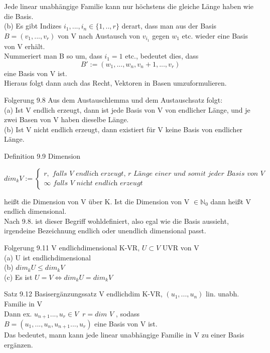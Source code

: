 \documentclass[headsepline,12pt,a4paper]{scrartcl}
\begin{document}
Jede linear unabhängige Familie kann nur höchstens die gleiche Länge haben wie die Basis. \\

(b) Es gibt Indizes $i_1,...,i_n \in \{1,..,r\}$ derart, dass man aus der Basis $B = (v_1,...,v_r)$ von V nach Austausch von $v_{i_1}$ gegen $w_1$ etc. wieder eine Basis von V erhält. \\
Nummeriert man B so um, dass $i_1 = 1$ etc., bedeutet dies, dass 
$$ B':=(w_1,...,w_n,v_n+1,...,v_r) $$ 
eine Basis von V ist. \\

Hieraus folgt dann auch das Recht, Vektoren in Basen umzuformulieren. \\

\item[Folgerung 9.8]
Aus dem Austauschlemma und dem Austauschsatz folgt: \\

(a) Ist V endlich erzeugt, dann ist jede Basis von V von endlicher Länge, und je zwei Basen von V haben dieselbe Länge. \\
(b) Ist V nicht endlich erzeugt, dann existiert für V keine Basis von endlicher Länge. \\

\newpage

\begin{center}
\item[Definition 9.9 Dimension]
\end{center}

$$\textit{dim}_k V:= \begin{cases} 
r, \textit{      falls V endlich erzeugt, r Länge einer und somit jeder Basis von V} \\
\infty \textit{     falls V nicht endlich erzeugt } 
\end{cases} $$

heißt die Dimension von V über K. Ist die Dimension von V $\in \mathbb{N}_0$ dann heißt V endlich dimensional. \\
Nach 9.8. ist dieser Begriff wohldefiniert, also egal wie die Basis aussieht, irgendeine Bezeichnung endlich oder unendlich dimensional passt. \\

\item[Folgerung 9.11]
V endlichdimensional K-VR, $U \subset V$ UVR von V \\

(a) U ist endlichdimensional \\
(b) $\textit{dim}_k U \leq \textit{dim}_k V $ \\
(c) Es ist $U=V \Leftrightarrow \textit{dim}_k U = \textit{dim}_k V$ \\


\item[Satz 9.12 Basisergänzungssatz ]
V endlichdim K-VR, $(u_1,...,u_n)$ lin. unabh. Familie in V \\
Dann ex. $u_{n+1}...,u_r \in V \; \; r = \textit{dim  }V$ , sodass \\
$B=(u_1,...,u_n,u_{n+1}...,u_r)$ eine Basis von V ist. \\

Das bedeutet, mann kann jede linear unabhängige Familie in V zu einer Basis ergänzen. \\
\end{document}
